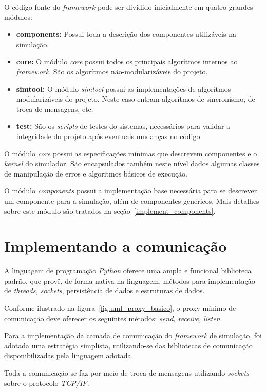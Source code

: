 O código fonte do \textit{framework} pode ser dividido inicialmente em quatro grandes módulos:

\begin{itemize}
\item \textbf{components:} Possui toda a descrição dos componentes utilizáveis na simulação.
\item \textbf{core:} O módulo \textit{core} possui todos os principais algorítmos internos ao \textit{framework}. São os algorítmos não-modularizáveis do projeto.
\item \textbf{simtool:} O módulo \textit{simtool} possui as implementações de algorítmos modularizáveis do projeto. Neste caso entram algorítmos de sincronismo, de troca de mensagens, etc.
\item \textbf{test:} São os \textit{scripts} de testes do sistemas, necessários para validar a integridade do projeto após eventuais mudanças no código.
\end{itemize}

O módulo \textit{core} possui as especificações mínimas que descrevem componentes e o \textit{kernel} do simulador. São encapsulados também neste nível dados algumas classes de manipulação de erros e algoritmos básicos de execução.

O módulo \textit{components} possui a implementação base necessária para se descrever um componente para a simulação, além de componentes genéricos. Mais detalhes sobre este módulo são tratados na seção~\ref{implement_components}.

\section{Implementando a comunicação}

A linguagem de programação \textit{Python} oferece uma ampla e funcional biblioteca padrão, que provê, de forma nativa na linguagem, métodos para implementação de \textit{threads, sockets}, persistência de dados e estruturas de dados.

Conforme ilustrado na figura~\ref{fig:uml_proxy_basico}, o proxy mínimo de comunicação deve oferecer os seguintes métodos: \textit{send, receive, listen}.

Para a implementação da camada de comunicação do \textit{framework} de simulação, foi adotada uma estratégia simplista, utilizando-se das bibliotecas de comunicação disponibilizadas pela linguagem adotada.

Toda a comunicação se faz por meio de troca de mensagens utilizando \textit{sockets} sobre o protocolo \textit{TCP/IP}.

